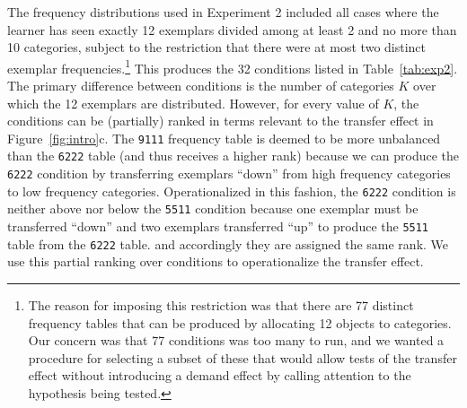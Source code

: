 \documentclass[doc]{apa6}
\newcommand{\dist}[1]{\texttt{#1}}
\begin{document}
The frequency distributions used in Experiment 2 included all cases where the learner has seen exactly 12 exemplars divided among at least 2 and no more than 10 categories, subject to the restriction that there were at most  two distinct exemplar frequencies.\footnote{The reason for imposing this restriction was that there are 77 distinct frequency tables that can be produced by allocating 12 objects to categories. Our concern was that 77 conditions was too many to run, and we wanted a procedure for selecting a subset of these that would allow tests of the transfer effect without introducing a demand effect by calling attention to the hypothesis being tested.} This produces the 32 conditions listed in Table~\ref{tab:exp2}. The primary difference between conditions is the number of categories $K$ over which the 12 exemplars are distributed. However, for every value of $K$, the conditions can be (partially) ranked in terms relevant to the transfer effect in Figure~\ref{fig:intro}c. The \dist{9111} frequency table is deemed to be more unbalanced than the \dist{6222} table (and thus receives a higher rank) because we can produce the \dist{6222} condition by transferring exemplars ``down'' from high frequency categories to low frequency categories. Operationalized in this fashion, the \dist{6222} condition is neither above nor below the \dist{5511} condition because one exemplar must be transferred ``down'' and two exemplars transferred ``up'' to produce the \dist{5511} table from the \dist{6222} table. and accordingly they are assigned the same rank. We use this partial ranking over conditions to operationalize the transfer effect.
\end{document}
